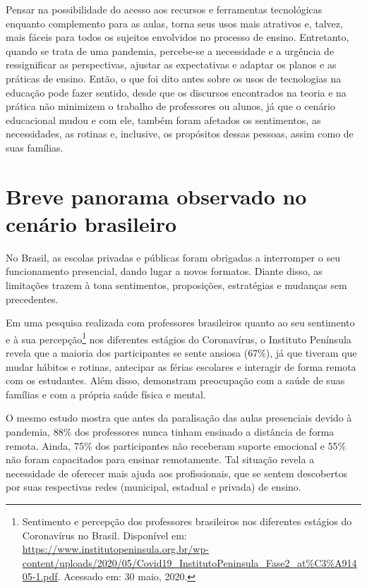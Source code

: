 \documentclass{textolivre}
\begin{document}
Pensar na possibilidade do acesso aos recursos e ferramentas tecnológicas enquanto complemento para as aulas, torna seus usos mais atrativos e, talvez, mais fáceis para todos os sujeitos envolvidos no processo de ensino. Entretanto, quando se trata de uma pandemia, percebe-se a necessidade e a urgência de ressignificar as perspectivas, ajustar as expectativas e adaptar os planos e as práticas de ensino. Então, o que foi dito antes sobre os usos de tecnologias na educação pode fazer sentido, desde que os discursos encontrados na teoria e na prática não minimizem o trabalho de professores ou alunos, já que o cenário educacional mudou e com ele, também foram afetados os sentimentos, as necessidades, as rotinas e, inclusive, os propósitos dessas pessoas, assim como de suas famílias.

\section{Breve panorama observado no cenário brasileiro}\label{sec-panorama}
No Brasil, as escolas privadas e públicas foram obrigadas a interromper o seu funcionamento presencial, dando lugar a novos formatos. Diante disso, as limitações trazem à tona sentimentos, proposições, estratégias e mudanças sem precedentes.

Em uma pesquisa realizada com professores brasileiros quanto ao seu sentimento e à sua percepção\footnote{Sentimento e percepção dos professores brasileiros nos diferentes estágios do Coronavírus no Brasil. Disponível em: \url{https://www.institutopeninsula.org.br/wp-content/uploads/2020/05/Covid19_InstitutoPeninsula_Fase2_at\%C3\%A91405-1.pdf}. Acessado em: 30 maio, 2020.} nos diferentes estágios do Coronavírus, o Instituto Península revela que a maioria dos participantes se sente ansiosa (67\%), já que tiveram que mudar hábitos e rotinas, antecipar as férias escolares e interagir de forma remota com os estudantes. Além disso, demonstram preocupação com a saúde de suas famílias e com a própria saúde física e mental.

O mesmo estudo mostra que antes da paralisação das aulas presenciais devido à pandemia, 88\% dos professores nunca tinham ensinado a distância de forma remota. Ainda, 75\% dos participantes não receberam suporte emocional e 55\% não foram capacitados para ensinar remotamente. Tal situação revela a necessidade de oferecer mais ajuda aos profissionais, que se sentem descobertos por suas respectivas redes (municipal, estadual e privada) de ensino. 
\end{document}
